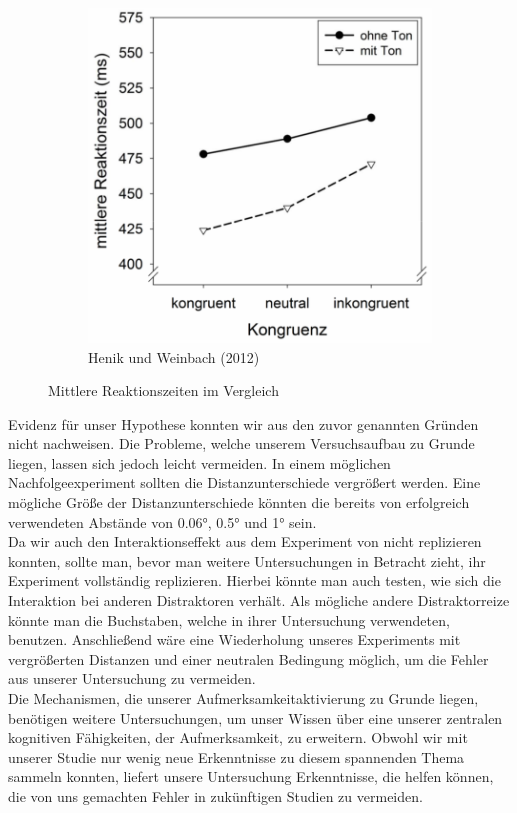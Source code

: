 \begin{figure}[t]
\begin{subfigure}[b]{0.49\textwidth}
	       \includegraphics[width=\textwidth]{grafiken/Vergleich-henik.png}
	       \caption{Henik und Weinbach (2012)}
	       \label{fig:exp2}
	    \end{subfigure}
		\caption{Mittlere Reaktionszeiten im Vergleich}
		\label{fig:vergleich} 
\end{figure}
Evidenz für unser Hypothese konnten wir aus den zuvor genannten Gründen nicht nachweisen. Die Probleme, welche unserem Versuchsaufbau zu Grunde liegen, lassen sich jedoch leicht vermeiden. In einem möglichen Nachfolgeexperiment sollten die Distanzunterschiede vergrößert werden. Eine mögliche Größe der Distanzunterschiede könnten die bereits von \textcite{eriksen1974effects} erfolgreich verwendeten Abstände von 0.06°, 0.5° und 1° sein.\\
Da wir auch den Interaktionseffekt aus dem Experiment von \textcite{weinbach2012relationship} nicht replizieren konnten, sollte man, bevor man weitere Untersuchungen in Betracht zieht, ihr Experiment vollständig replizieren. Hierbei könnte man auch testen, wie sich die Interaktion bei anderen Distraktoren verhält. Als mögliche andere Distraktorreize könnte man die Buchstaben, welche \textcite{eriksen1974effects} in ihrer Untersuchung verwendeten, benutzen. Anschließend wäre eine Wiederholung unseres Experiments mit vergrößerten Distanzen und einer neutralen Bedingung möglich, um die Fehler aus unserer Untersuchung zu vermeiden.\\
Die Mechanismen, die unserer Aufmerksamkeitaktivierung zu Grunde liegen, benötigen weitere Untersuchungen, um unser Wissen über eine unserer zentralen kognitiven Fähigkeiten, der Aufmerksamkeit, zu erweitern. Obwohl wir mit unserer Studie nur wenig neue Erkenntnisse zu diesem spannenden Thema sammeln konnten, liefert unsere Untersuchung Erkenntnisse, die helfen können, die von uns gemachten Fehler in zukünftigen Studien zu vermeiden. 
